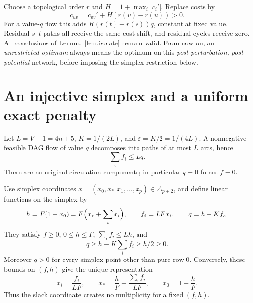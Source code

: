 \documentclass[11pt]{article}
\theoremstyle{remark}\newtheorem{remark}[theorem]{Remark}
\newcommand{\eps}{\varepsilon}
\begin{document}
Choose a topological order $r$ and $H=1+\max_i|c_i'|$. Replace costs by
\[
 \bar c_{uv}=c_{uv}'+H(r(v)-r(u))>0.
\]
For a value-$q$ flow this adds $H(r(t)-r(s))q$, constant at fixed value. Residual $s$--$t$ paths all receive the same cost shift, and residual cycles receive zero. All conclusions of Lemma~\ref{lem:isolate} remain valid. From now on, an \emph{unrestricted optimum} always means the optimum on this \emph{post-perturbation, post-potential} network, before imposing the simplex restriction below.

\section{An injective simplex and a uniform exact penalty}
Let $L=V-1=4n+5$, $K=1/(2L)$, and $\eps=K/2=1/(4L)$. A nonnegative feasible DAG flow of value $q$ decomposes into paths of at most $L$ arcs, hence
\begin{equation}\label{eq:pathbound}
 \sum_i f_i\le Lq.
\end{equation}
There are no original circulation components; in particular $q=0$ forces $f=0$.

Use simplex coordinates $x=(x_0,x_*,x_1,\ldots,x_p)\in\Delta_{p+2}$, and define linear functions on the simplex by
\begin{equation}\label{eq:simplex}
 h=F(1-x_0)=F\Bigl(x_*+\sum_i x_i\Bigr),\qquad
 f_i=LFx_i,\qquad q=h-Kf_e.
\end{equation}
They satisfy $f\ge0$, $0\le h\le F$, $\sum_i f_i\le Lh$, and
\begin{equation}\label{eq:qpositive}
 q\ge h-K\sum_i f_i\ge h/2\ge0.
\end{equation}
Moreover $q>0$ for every simplex point other than pure row $0$. Conversely, these bounds on $(f,h)$ give the unique representation
\begin{equation}\label{eq:inverse}
 x_i=\frac{f_i}{LF},\qquad x_*=\frac hF-\frac{\sum_i f_i}{LF},\qquad x_0=1-\frac hF.
\end{equation}
Thus the slack coordinate creates no multiplicity for a fixed $(f,h)$.
\end{document}
